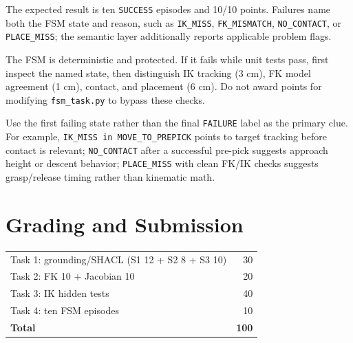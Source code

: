 \documentclass[11pt]{article}
\newcommand{\code}[1]{\nolinkurl{#1}}
\begin{document}
The expected result is ten \code{SUCCESS} episodes and 10/10 points. Failures
name both the FSM state and reason, such as \code{IK_MISS},
\code{FK_MISMATCH}, \code{NO_CONTACT}, or \code{PLACE_MISS}; the semantic
layer additionally reports applicable problem flags.

\begin{tutornote}
The FSM is deterministic and protected. If it fails while unit tests pass,
first inspect the named state, then distinguish IK tracking (3 cm), FK model
agreement (1 cm), contact, and placement (6 cm). Do not award points for
modifying \code{fsm_task.py} to bypass these checks.

Use the first failing state rather than the final \code{FAILURE} label as the
primary clue. For example, \code{IK_MISS in MOVE_TO_PREPICK} points to target
tracking before contact is relevant; \code{NO_CONTACT} after a successful
pre-pick suggests approach height or descent behavior; \code{PLACE_MISS} with
clean FK/IK checks suggests grasp/release timing rather than kinematic math.
\end{tutornote}

\section{Grading and Submission}

\begin{center}
\begin{tabular}{lr}
\toprule
Task 1: grounding/SHACL (S1 12 + S2 8 + S3 10) & 30\\
Task 2: FK 10 + Jacobian 10 & 20\\
Task 3: IK hidden tests & 40\\
Task 4: ten FSM episodes & 10\\
\midrule
\textbf{Total} & \textbf{100}\\
\bottomrule
\end{tabular}
\end{center}
\end{document}
